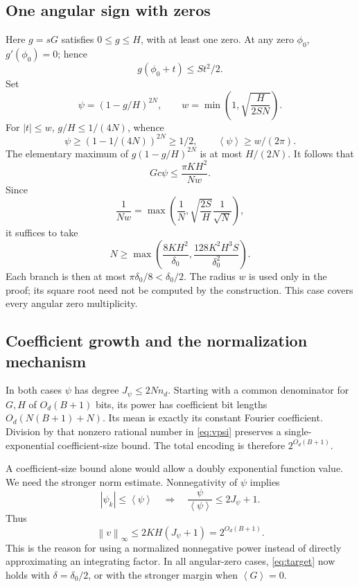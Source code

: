 \documentclass[11pt]{article}
\theoremstyle{remark}\newtheorem{remark}[theorem]{Remark}
\newcommand{\mean}[1]{\left\langle #1\right\rangle}
\newcommand{\norm}[1]{\left\|#1\right\|_\infty}
\newcommand{\se}{2^{O_d(B+1)}}
\begin{document}
\subsection{One angular sign with zeros}

Here \(g=sG\) satisfies \(0\leq g\leq H\), with at least one zero. At any zero \(\phi_0\), \(g'(\phi_0)=0\); hence
\[
                       g(\phi_0+t)\leq St^2/2.
\]
Set
\[
 \psi=(1-g/H)^{2N},\qquad
 w=\min\left(1,\sqrt{\frac H{2SN}}\right).
\]
For \(|t|\leq w\), \(g/H\leq1/(4N)\), whence
\[
              \psi\geq(1-1/(4N))^{2N}\geq1/2,\qquad
              \mean\psi\geq w/(2\pi).
\]
The elementary maximum of \(g(1-g/H)^{2N}\) is at most \(H/(2N)\). It follows that
\[
                 Gc\psi\leq\frac{\pi KH^2}{Nw}.
\]
Since
\[
 \frac1{Nw}=\max\left(\frac1N,\sqrt{\frac{2S}H}\frac1{\sqrt N}\right),
\]
it suffices to take
\begin{equation}\label{eq:Nonesign}
 N\geq\max\left(\frac{8KH^2}{\delta_0},
               \frac{128K^2H^3S}{\delta_0^2}\right).
\end{equation}
Each branch is then at most \(\pi\delta_0/8<\delta_0/2\).
The radius \(w\) is used only in the proof; its square root need not be computed by the construction. This case covers every angular zero multiplicity.

\subsection{Coefficient growth and the normalization mechanism}

In both cases \(\psi\) has degree \(J_\psi\leq2Nn_d\).
Starting with a common denominator for \(G,H\) of \(O_d(B+1)\) bits, its power has coefficient bit lengths \(O_d(N(B+1)+N)\). Its mean is exactly its constant Fourier coefficient. Division by that nonzero rational number in \eqref{eq:vpsi} preserves a single-exponential coefficient-size bound. The total encoding is therefore \(\se\).

A coefficient-size bound alone would allow a doubly exponential function value. We need the stronger norm estimate. Nonnegativity of \(\psi\) implies
\[
                 |\widehat\psi_k|\leq\mean\psi
 \quad\Longrightarrow\quad
                 \frac{\psi}{\mean\psi}\leq2J_\psi+1.
\]
Thus
\begin{equation}\label{eq:vnorm}
                  \norm v\leq2KH(J_\psi+1)=\se.
\end{equation}
This is the reason for using a normalized nonnegative power instead of directly approximating an integrating factor. In all angular-zero cases, \eqref{eq:target} now holds with \(\delta=\delta_0/2\), or with the stronger margin when \(\mean G=0\).
\end{document}

